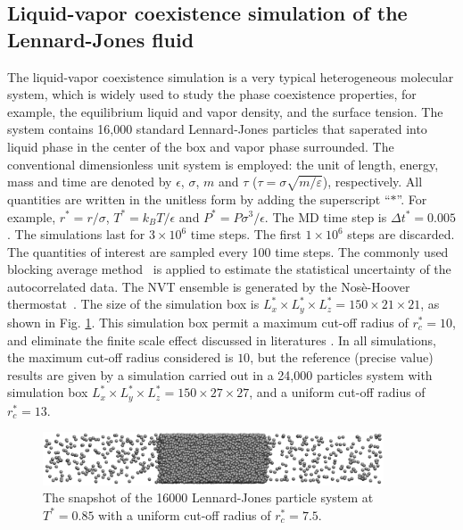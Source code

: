 \documentclass[aps,pre,preprint]{revtex4}
\begin{document}
\subsection{Liquid-vapor coexistence simulation of the Lennard-Jones fluid}\label{sec:tmp2.1}

The liquid-vapor coexistence simulation is a very typical
heterogeneous molecular system, which is widely used to study the
phase coexistence properties, for example, the equilibrium liquid and
vapor density, and the surface tension. The system contains 16,000
standard Lennard-Jones particles that saperated into liquid phase in
the center of the box and vapor phase surrounded.  The conventional
dimensionless unit system is employed: the unit of length, energy,
mass and time are denoted by $\epsilon$, $\sigma$, $m$ and $\tau$
($\tau = \sigma\sqrt{m/\varepsilon}$), respectively.  All quantities
are written in the unitless form by adding the superscript ``$\ast$''.
For example, $r^\ast = r / \sigma$, $T^\ast = k_BT / \epsilon$ and
$P^\ast = P \sigma^3 / \epsilon$.  The MD time step {is} $\Delta
t^\ast = 0.005$. The simulations last for $3\times 10^6$ time
steps. The first $1\times 10^6$ steps are discarded. The quantities of
interest are sampled every 100 time steps. The commonly used blocking
average method~\cite{flyvbjerg1989error} is applied to estimate the
statistical uncertainty of the autocorrelated data. The NVT ensemble
is generated by the Nos\`e-Hoover thermostat~\cite{nose1984molecular,
  hoover1985canonical}.  The size of the simulation box is $L_x^\ast
\times L_y^\ast \times L_z^\ast = 150\times 21\times 21$, as shown in
Fig. \ref{fig:tmp1}. This simulation box permit a maximum cut-off
radius of $r_c^\ast = 10$, and eliminate the finite scale effect
discussed in literatures \cite{orea2005oscillatory,
  biscay2009calculation}. In all simulations, the maximum cut-off
radius considered is $10$, but the reference (precise value) results
are given by a simulation carried out in a 24,000 particles system
with simulation box $L_x^\ast \times L_y^\ast \times L_z^\ast =
150\times 27\times 27$, and a uniform cut-off radius of $r_c^\ast =
13$.

\begin{figure}
  \centering
  \includegraphics[width=0.9\textwidth]{fig/t0.85-n16000-rc07.5uni/confout.eps}
  \caption{The snapshot of the 16000 Lennard-Jones particle system at
    $T^\ast=0.85$ with a uniform cut-off radius of $r_c^\ast = 7.5$.}
  \label{fig:tmp1}
\end{figure}
\end{document}
